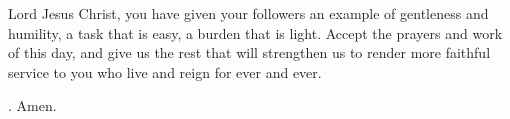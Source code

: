 \lettrine[loversize=0.15,lines=2]{L}{}ord Jesus Christ,
you have given your followers
an example of gentleness and humility,
a task that is easy, a burden that is light.
Accept the prayers and work of this day,
and give us the rest that will strengthen us
to render more faithful service to you
who live and reign for ever and ever.
\par \Rbar. Amen.
